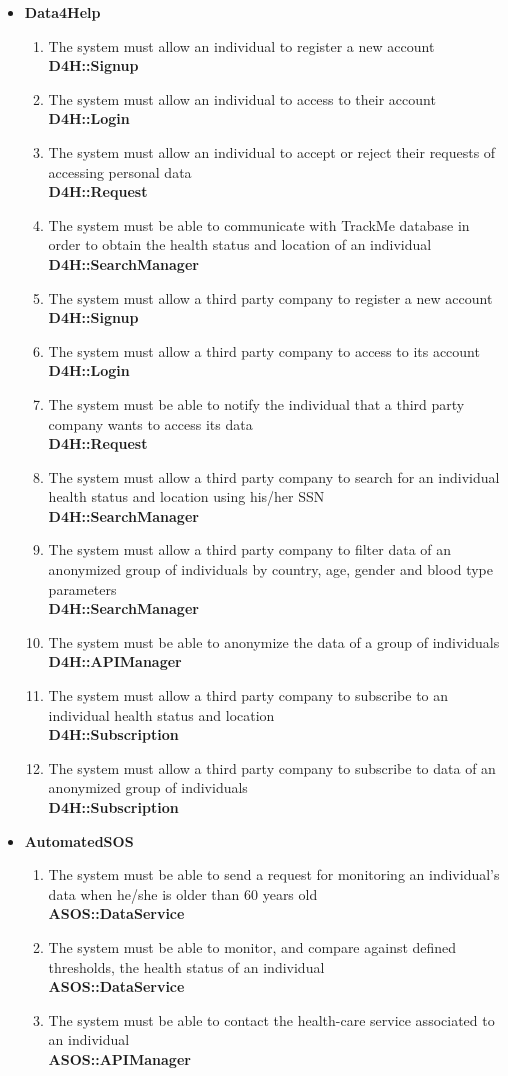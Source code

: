 \documentclass[a4paper, hidelinks, 12pt]{report}
\newcommand\requirement[1]{\item[{[R#1]}] }
\begin{document}
\begin{itemize}
	\item{\textbf{Data4Help}}
	\begin{enumerate}
		\requirement{1} The system must allow an individual to register a new account \\
		\textbf{D4H::Signup}
		\requirement{2} The system must allow an individual to access to their account \\
		\textbf{D4H::Login}
		\requirement{3} The system must allow an individual to accept or reject their requests of accessing personal data \\
		\textbf{D4H::Request}
		\requirement{4} The system must be able to communicate with TrackMe database in order to obtain the health status and location of an individual \\
		\textbf{D4H::SearchManager}
		\requirement{5} The system must allow a third party company to register a new account \\								\textbf{D4H::Signup}
		\requirement{6} The system must allow a third party company to access to its account 	\\								\textbf{D4H::Login}
		\requirement{7} The system must be able to notify the individual that a third party company wants to access its data \\
		\textbf{D4H::Request}
		\requirement{8} The system must allow a third party company to search for an individual health status and location using his/her SSN \\
		 \textbf{D4H::SearchManager}
		 \requirement{9} The system must allow a third party company to filter data of an anonymized group of individuals by country, age, gender and blood type parameters \\ 
		 \textbf{D4H::SearchManager}
		 \requirement{10} The system must be able to anonymize the data of a group of individuals \\
		 \textbf{D4H::APIManager}
		 \requirement{11} The system must allow a third party company to subscribe to an individual health status and location \\ 
		\textbf{D4H::Subscription}
		\requirement{12} The system must allow a third party company to subscribe to data of an anonymized group of individuals \\
		\textbf{D4H::Subscription}
	\end{enumerate}	
		
	\item{\textbf{AutomatedSOS}}
	\begin{enumerate}
		\requirement{13} The system must be able to send a request for monitoring an individual's data when he/she is older than 60 years old \\
		\textbf{ASOS::DataService}
		\requirement{14} The system must be able to monitor, and compare against defined thresholds, the health status of an individual \\
		\textbf{ASOS::DataService}
		\requirement{15} The system must be able to contact the health-care service associated to an individual \\
		\textbf{ASOS::APIManager}
	\end{enumerate}
	

\end{itemize}
\end{document}
